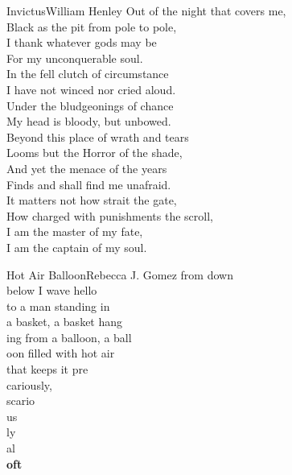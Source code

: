 \documentclass[../main.tex]{subfiles}
\begin{document}
	\begin{poem*}{Invictus}{William Henley}
		Out of the night that covers me,\\
		\hspace{2em}Black as the pit from pole to pole,\\
		I thank whatever gods may be\\
		\hspace{2em}For my unconquerable soul.\\[12pt]
		In the fell clutch of circumstance\\
		\hspace{2em}I have not winced nor cried aloud.\\
		Under the bludgeonings of chance\\
		\hspace{2em}My head is bloody, but unbowed.\\[12pt]
		Beyond this place of wrath and tears\\
		\hspace{2em}Looms but the Horror of the shade,\\
		And yet the menace of the years\\
		\hspace{2em}Finds and shall find me unafraid.\\[12pt]
		It matters not how strait the gate,\\
		\hspace{2em}How charged with punishments the scroll,\\
		I am the master of my fate,\\
		\hspace{2em}I am the captain of my soul.\\
	\end{poem*}

	\begin{poem*}{Hot Air Balloon}{Rebecca J. Gomez}
		\centering
		from down\\
		below I wave hello\\
		to a man standing in\\
		a basket, a basket hang\\
		ing from a balloon, a ball\\
		oon filled with hot air\\
		that keeps it pre\\
		cariously,\\
		scario\\
		us\\
		ly\\ 
		al\\
		\textbf{oft}
	\end{poem*}
\end{document}
